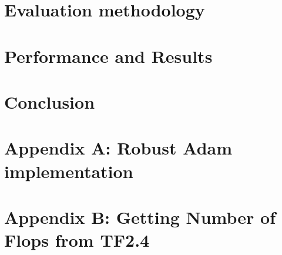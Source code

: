 \documentclass[journal]{IEEEtranTIE}
\begin{document}
\section{Evaluation methodology} \label{sec:Meth}

    
    
    
    
\section{Performance and Results}\label{sec:results}



\section{Conclusion} \label{sec:conclussion}





%
%
{
\clearpage
\appendices
\section{Appendix A: Robust Adam implementation}  \label{app:RoAdam}

\clearpage
\section{Appendix B: Getting Number of Flops from TF2.4}  \label{app:flops}

}
{}
\end{document}
